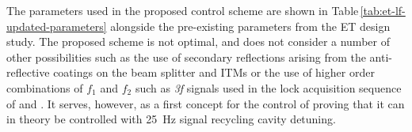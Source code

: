 The parameters used in the proposed control scheme are shown in Table\,\ref{tab:et-lf-updated-parameters} alongside the pre-existing parameters from the \gls{ET} design study. The proposed scheme is not optimal, and does not consider a number of other possibilities such as the use of secondary reflections arising from the anti-reflective coatings on the beam splitter and \glspl{ITM} or the use of higher order combinations of $f_1$ and $f_2$ such as \emph{3f} signals used in the lock acquisition sequence of \VIRGO{} \cite{Acernese2008} and \ALIGO{} \cite{Staley2014}. It serves, however, as a first concept for the control of \ETLF{} proving that it can in theory be controlled with \SI{25}{\hertz} signal recycling cavity detuning.

\begin{table}
  \centering
\end{table}
